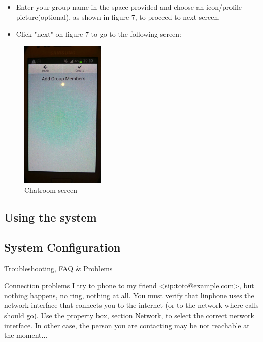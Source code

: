 \documentclass[a4paper]{article}
\begin{document}
\begin{itemize}
\item Enter your group name in the space provided and choose an icon/profile picture(optional), as shown in figure 7, to proceed to next screen. 
\end{itemize}

\begin{itemize}
\item Click "next" on figure 7 to go to the following screen:
\end{itemize}

\begin{figure}[h]
\centering
\includegraphics[scale=0.30, width=40mm]{./pictures/s3.jpg}
\caption{\label{fig:Agile}Chatroom screen}
\end{figure}




\newpage
\subsection{Using the system}

\subsection{System Configuration}
Troubleshooting, FAQ & Problems

Connection problems
I try to phone to my friend <sip:toto@example.com>, but nothing happens, no ring, nothing
at all.
You must verify that linphone uses the network interface that connects you to the
internet (or to the network where calls should go). Use the property box, section
Network, to select the correct network interface.
In other case, the person you are contacting may be not reachable at the moment...
\end{document}
